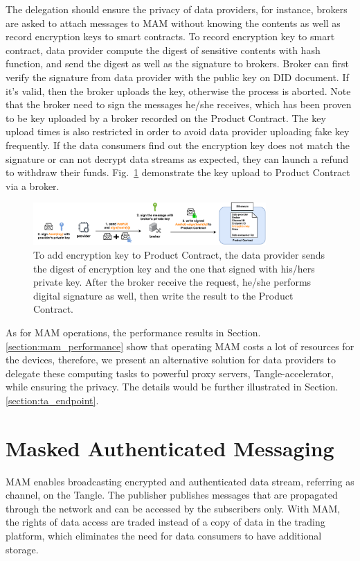 \documentclass[conference]{IEEEtran}
\begin{document}
The delegation should ensure the privacy of data providers, for instance, brokers are asked to attach messages to MAM without knowing the contents as well as record encryption keys to smart contracts. To record encryption key to smart contract, data provider compute the digest of sensitive contents with hash function, and send the digest as well as the signature to brokers. Broker can first verify the signature from data provider with the public key on DID document. If it's valid, then the broker uploads the key, otherwise the process is aborted. Note that the broker need to sign the messages he/she receives, which has been proven to be key uploaded by a broker recorded on the Product Contract. The key upload times is also restricted in order to avoid data provider uploading fake key frequently. If the data consumers find out the encryption key does not match the signature or can not decrypt data streams as expected, they can launch a refund to withdraw their funds. Fig.~\ref{fig:key_upload} demonstrate the key upload to Product Contract via a broker. 

\begin{figure}[H]
    \centering
    \includegraphics[width=3.5in]{key_upload}
    \caption{To add encryption key to Product Contract, the data provider sends the digest of encryption key and the one that signed with his/hers private key. After the broker receive the request, he/she performs digital signature as well, then write the result to the Product Contract.}
    \label{fig:key_upload}
\end{figure}

As for MAM operations, the performance results in Section.\ref{section:mam_performance} show that operating MAM costs a lot of resources for the devices, therefore, we present an alternative solution for data providers to delegate these computing tasks to powerful proxy servers, Tangle-accelerator\cite{TA}, while ensuring the privacy. The details would be further illustrated in Section.\ref{section:ta_endpoint}. 

\section{Masked Authenticated Messaging}
MAM enables broadcasting encrypted and authenticated data stream, referring as channel, on the Tangle. The publisher publishes messages that are propagated through the network and can be accessed by the subscribers only. With MAM, the rights of data access are traded instead of a copy of data in the trading platform, which eliminates the need for data consumers to have additional storage. 
\end{document}

